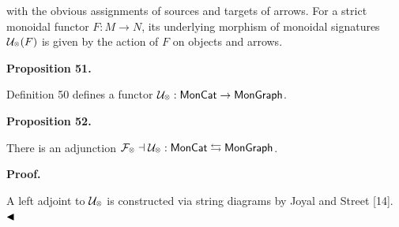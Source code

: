\documentclass[10pt,a4paper]{article}
\begin{document}
 
with the obvious assignments of sources and targets of arrows. For a strict monoidal functor $F:M\to N$, its underlying morphism of monoidal signatures $\mathcal{U}_{\mathbin{\raisebox{1.25pt}{$\scriptscriptstyle\otimes$}}}(F)$ is given by the action of $F$ on objects and arrows.\par
 
 
 
 
\par\medskip\noindent\textbf{Proposition 51.}\par
 
 
Definition 50 defines a functor $\mathcal{U}_{\mathbin{\raisebox{1.25pt}{$\scriptscriptstyle\otimes$}}}:\mathsf{MonCat}\to\mathsf{MonGraph}$.\par
 
 
 
 
\par\medskip\noindent\textbf{Proposition 52.}\par
 
 
There is an adjunction $\mathcal{F}_{\mathbin{\raisebox{1.25pt}{$\scriptscriptstyle\otimes$}}}\dashv\mathcal{U}_{\mathbin{\raisebox{1.25pt}{$\scriptscriptstyle\otimes$}}}:\mathsf{MonCat}\leftrightarrows\mathsf{MonGraph}$.\par
 
 
 
 
 
\par\medskip\noindent\textbf{Proof.}\par
 
 
A left adjoint to $\mathcal{U}_{\mathbin{\raisebox{1.25pt}{$\scriptscriptstyle\otimes$}}}$ is constructed via string diagrams by Joyal and Street [14]. $\hfill\blacktriangleleft$\par
 
 
\end{document}
